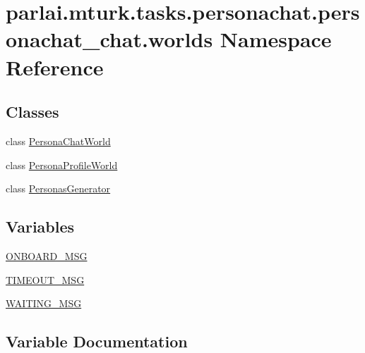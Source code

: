 \hypertarget{namespaceparlai_1_1mturk_1_1tasks_1_1personachat_1_1personachat__chat_1_1worlds}{}\section{parlai.\+mturk.\+tasks.\+personachat.\+personachat\+\_\+chat.\+worlds Namespace Reference}
\label{namespaceparlai_1_1mturk_1_1tasks_1_1personachat_1_1personachat__chat_1_1worlds}
\subsection*{Classes}
\begin{DoxyCompactItemize}
\item 
class \hyperlink{classparlai_1_1mturk_1_1tasks_1_1personachat_1_1personachat__chat_1_1worlds_1_1PersonaChatWorld}{Persona\+Chat\+World}
\item 
class \hyperlink{classparlai_1_1mturk_1_1tasks_1_1personachat_1_1personachat__chat_1_1worlds_1_1PersonaProfileWorld}{Persona\+Profile\+World}
\item 
class \hyperlink{classparlai_1_1mturk_1_1tasks_1_1personachat_1_1personachat__chat_1_1worlds_1_1PersonasGenerator}{Personas\+Generator}
\end{DoxyCompactItemize}
\subsection*{Variables}
\begin{DoxyCompactItemize}
\item 
\hyperlink{namespaceparlai_1_1mturk_1_1tasks_1_1personachat_1_1personachat__chat_1_1worlds_aa929e47684014064db729dd912052261}{O\+N\+B\+O\+A\+R\+D\+\_\+\+M\+SG}
\item 
\hyperlink{namespaceparlai_1_1mturk_1_1tasks_1_1personachat_1_1personachat__chat_1_1worlds_a6069cb03772219d749343e37e2eab5f4}{T\+I\+M\+E\+O\+U\+T\+\_\+\+M\+SG}
\item 
\hyperlink{namespaceparlai_1_1mturk_1_1tasks_1_1personachat_1_1personachat__chat_1_1worlds_a3e8d0e8a9aa96fb96fae017c528fd287}{W\+A\+I\+T\+I\+N\+G\+\_\+\+M\+SG}
\end{DoxyCompactItemize}


\subsection{Variable Documentation}
\mbox{\label{namespaceparlai_1_1mturk_1_1tasks_1_1personachat_1_1personachat__chat_1_1worlds_aa929e47684014064db729dd912052261}} 
